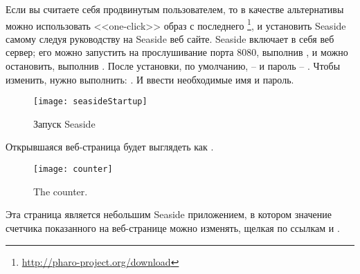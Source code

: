 \documentclass[a4paper,10pt,twoside]{book}
\begin{document}
Если вы считаете себя продвинутым пользователем,
то в качестве альтернативы можно использовать <<one-click>> образ
с последнего \footnote{\url{http://pharo-project.org/download}},
и установить Seaside самому следуя руководству
 на Seaside веб сайте.
Seaside включает в себя веб сервер; его можно запустить на прослушивание порта 8080,
выполнив  ,
и можно остановить, выполнив .
После установки, по умолчанию,
 --  и пароль -- .
Чтобы изменить, нужно выполнить:  .
И ввести необходимые имя и пароль.


\begin{figure}[tbh]
\begin{center}
\texttt{[image: seasideStartup]}

\caption{Запуск Seaside}

\end{center}
\end{figure}


\noindent
Открывшаяся веб-страница будет выглядеть как .

\noindent

\begin{figure}[htb]
\begin{center}
\texttt{[image: counter]}
\caption{The counter.}
\end{center}
\end{figure}

\noindent

Эта страница является небольшим Seaside приложением,
в котором значение счетчика показанного на веб-странице можно изменять,
щелкая по ссылкам \link{++} и \link{--}.
\end{document}
